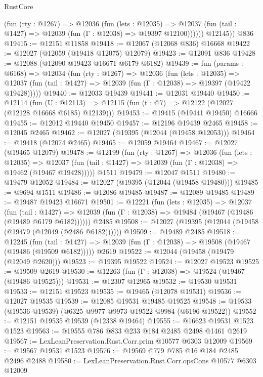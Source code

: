 \begin{lexlean}{RustCore}
\begin{coremodule}
            (fun (rty : @1267) =>
            @12036
              (fun (lets : @12035) =>
              @12037 (fun (tail : @1427) => @12039 (fun (Γ : @12038) => @19397 @12100))))))
        @12145))
    @836
@19415 := @12151 @11858
@19418 := @12067 (@12068 @836) @16668
@19422 := @12027 (@12059 (@19418 @12075) @12079)
@19423 := @12091 @836
@19428 := @12088 (@12090 @19423 @16671 @6179 @6182)
@19439 := fun (params : @6168) =>
  @12034
    (fun (rty : @1267) =>
    @12036
      (fun (lets : @12035) =>
      @12037 (fun (tail : @1427) => @12039 (fun (Γ : @12038) => @19397 (@19422 @19428)))))
@19440 := @12033 @19439
@19441 := @12031 @19440
@19450 := @12114
    (fun (U : @12113) => @12115 (fun (t : @7) => @12122 (@12027 (@12128 @16668 @6185) @12139)))
@19453 := @19415 (@19441 @19450) @16666
@19455 := @12012 @19440 @19450
@19457 := @12196 @19439 @2465
@19458 := @12045 @2465
@19462 := @12027 (@19395 (@12044 (@19458 @12053)))
@19464 := @19418 (@12074 @2465)
@19465 := @12059 @19464
@19467 := @12027 (@19465 @12079)
@19478 := @12199
    (fun (rty : @1267) =>
    @12036
      (fun (lets : @12035) =>
      @12037 (fun (tail : @1427) => @12039 (fun (Γ : @12038) => @19462 (@19467 @19428)))))
    @1511
@19479 := @12047 @1511
@19480 := @19479 @12052
@19484 := @12027 (@19395 (@12044 (@19458 @19480)))
@19485 := @9694 @1511
@19486 := @12086 @19485
@19487 := @12089 @19485
@19489 := @19487 @19423 @16671
@19501 := @12221
    (fun (lets : @12035) =>
    @12037
      (fun (tail : @1427) =>
      @12039 (fun (Γ : @12038) => @19484 (@19467 (@19486 (@19489 @6179 @6182))))))
    @2485
@19508 := @12027 (@19395 (@12044 (@19458 (@19479 (@12049 (@2486 @6182))))))
@19509 := @19489 @2485
@19518 := @12245
    (fun (tail : @1427) => @12039 (fun (Γ : @12038) => @19508 (@19467 (@19486 (@19509 @6182)))))
    @2619
@19522 := @12044 (@19458 (@19479 (@12049 @2620)))
@19523 := @19395 @19522
@19524 := @12027 @19523
@19525 := @19509 @2619
@19530 := @12263 (fun (Γ : @12038) => @19524 (@19467 (@19486 @19525)))
@19531 := @12307 @12965
@19532 := @19530 @19531
@19533 := @12151 @19523
@19535 := @19465 (@12078 @19531)
@19536 := @12027 @19535
@19539 := @12085 @19531 @19485 @19525
@19548 := @19533 (@19536 @19539) (@6325 @9977 @9973 @19522 @9984 (@6196 @19522))
@19552 := @12151 @19535 @19539 (@12338 @19464)
@19555 := @16623 @19531 @1523 @1523
@19563 := @19555 @786 @833 @233 @184 @2485 @2498 @1461 @2619
@19567 := LexLeanPreservation.Rust.Corr.prim @10577 @6303 @12009
@19569 := @19567 @19531 @1523
@19576 := @19569 @779 @785 @16 @184 @2485 @2496 @2488
@19580 := LexLeanPreservation.Rust.Corr.opsCons @10577 @6303 @12009

\end{coremodule}
\end{lexlean}
